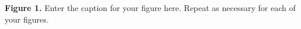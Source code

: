 \documentclass{frontiersSCNS} %
\begin{document}

 \textbf{Figure 1.}{ Enter the caption for your figure here.  Repeat as  necessary for each of your figures.}\label{fig:01}%


\end{document}
